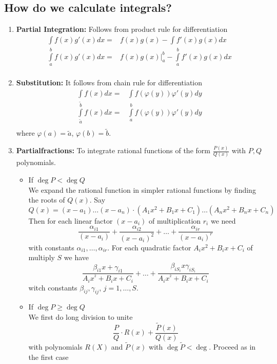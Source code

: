 \documentclass[a4paper]{article}
\begin{document}
\subsection*{How do we calculate integrals?}
\begin{enumerate}
\item \textbf{Partial Integration:} Follows from product rule for differentiation
\begin{align*}
\int f(x) g'(x) dx =& f(x)g(x) - \int f'(x) g(x) dx\\
\int\limits_a^b f(x) g'(x) dx =& \left.f(x)g(x)\right|_a^b - \int\limits_a^b f'(x) g(x) dx\\
\end{align*}
\item \textbf{Substitution:} It follows from chain rule for differentiation
\begin{align*}
\int f(x) dx =&\int f\left(\varphi(y)\right) \varphi'(y) dy\\
\int\limits_{\tilde{a}}^{\tilde{b}} f(x)  dx =&\int\limits_a^b f\left(\varphi(y)\right) \varphi'(y) dy\\
\end{align*}
where $\varphi(a)=\tilde{a}$, $\varphi(b)=\tilde{b}$.
\item \textbf{Partialfractions:} To integrate rational functions of the form $\frac{P(x)}{Q(x)}$ with $P,Q$ polynomials. 
\begin{itemize}
\item If $\deg P < \deg Q$\\
We expand the rational function in simpler rational functions by finding the roots of $Q(x)$. Say \[Q(x)=(x-a_1){\dots}(x-a_n)\cdot\left( A_1x^2 + B_1x+C_1\right)\dots\left( A_nx^2 + B_nx+C_n\right)\]
Then for each linear factor $\left( x-a_i\right)$ of multiplication $r_i$ we need 
\[\frac{\alpha_{i1}}{\left( x-a_i\right)}+\frac{\alpha_{i2}}{\left( x-a_i\right)^2}+\dots+\frac{\alpha_{ir}}{\left( x-a_i\right)^r}\]
with constants $\alpha_{i1},\dots,\alpha_{ir}$. For each quadratic factor $A_ix^2+B_ix+C_i$ of multiply $S$ we have 
\[\frac{\beta_{i1}x+\gamma_{i1}}{A_ix^^2+B_ix+C_i}+\dots+\frac{\beta_{iS_i}x\gamma_{iS_i}}{A_ix^^2+B_ix+C_i}\]
witch constants $\beta_{ij},\gamma_{ij}$, $j=1,\dots,S$.
\item If $\deg P \geq \deg Q$\\
We first do long division to unite
\[\frac{P}{Q}\cdot R(x) + \frac{\tilde{P}(x)}{{Q}(x)}\]
with polynomials $R(X)$ and $\tilde{P}(x)$ with $\deg \tilde{P}<\deg$. Proceed as in the first case
\end{itemize}
\end{enumerate}
\end{document}

